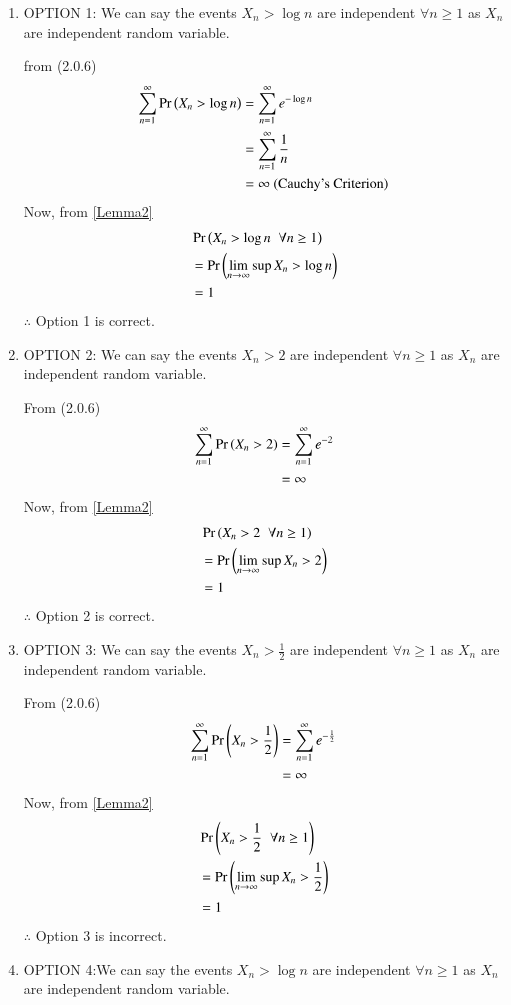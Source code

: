\documentclass[journal,12pt,twocolumn]{IEEEtran}
\begin{document}
\begin{enumerate}
    \item OPTION 1: 
    We can say the events $X_n>\log n$ are independent $\forall n\geq 1$ as $X_n$ are independent random variable.
    
   from (2.0.6)
    \begin{align}
        \sum_{n=1}^{\infty}\Pr\left(X_n > \log n\right) &=\sum_{n=1}^{\infty}e^{-\log n}\\ &=\sum_{n=1}^{\infty}\frac{1}{n}\\
        &= \infty\text{ (Cauchy's Criterion)}  
    \end{align}
    Now, from \eqref{Lemma2}
    \begin{align}
        &\Pr\left(X_n>\log n\hspace{0.2cm} \forall n\geq1\right)\\
        &=\Pr\left(\lim_{n \rightarrow \infty}\sup X_n>\log n\right)\\
        &=1
    \end{align}
    $\therefore$ Option 1 is correct. 
    
    \item OPTION 2: We can say the events $X_n>2$ are independent $\forall n\geq 1$ as $X_n$ are independent random variable.
    
    From (2.0.6)
    \begin{align}
        \sum_{n=1}^{\infty}\Pr\left(X_n > 2\right) &= \sum_{n=1}^{\infty}e^{-2}\\
                                            &= \infty
    \end{align}
    Now, from \eqref{Lemma2}
    \begin{align}
        &\Pr\left(X_n>2 \hspace{0.2cm} \forall n\geq1\right)\\
        &=\Pr\left(\lim_{n \rightarrow \infty}\sup X_n>2\right)\\
        &=1
    \end{align}
    $\therefore$ Option 2 is correct.
    
    \item OPTION 3: We can say the events $X_n>\frac{1}{2}$ are independent $\forall n\geq 1$ as $X_n$ are independent random variable.
    
    From (2.0.6)
    \begin{align}
        \sum_{n=1}^{\infty}\Pr\left(X_n > \frac{1}{2}\right) &= \sum_{n=1}^{\infty}e^{-\frac{1}{2}}\\
                                            &= \infty
    \end{align}
    Now, from \eqref{Lemma2}
    \begin{align}
        &\Pr\left(X_n>\frac{1}{2} \hspace{0.2cm} \forall n\geq1\right)\\
        &=\Pr\left(\lim_{n \rightarrow \infty}\sup X_n>\frac{1}{2}\right)\\
        &=1
    \end{align}
    $\therefore$ Option 3 is incorrect.
    \item OPTION 4:We can say the events $X_n>\log n$ are independent $\forall n\geq 1$ as $X_n$ are independent random variable.
    

\end{enumerate}
\end{document}
